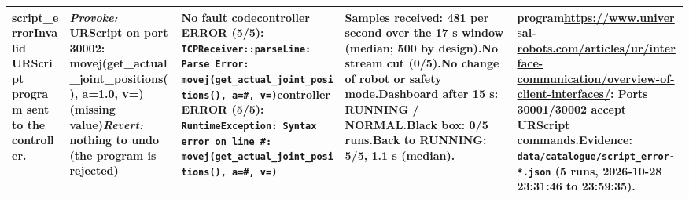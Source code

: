 \documentclass[10pt]{article}
\begin{document}
\begin{longtable}{@{}>{\raggedright\arraybackslash}p{2.7cm}>{\raggedright\arraybackslash}p{4.0cm}>{\raggedright\arraybackslash}p{7.6cm}>{\raggedright\arraybackslash}p{5.2cm}>{\raggedright\arraybackslash}p{6.0cm}@{}}
\textbf{script\_\allowbreak{}error}\newline Invalid URScript program sent to the controller. & \textit{Provoke:} URScript on port 30002: movej(get\_\allowbreak{}actual\_\allowbreak{}joint\_\allowbreak{}positions(),\allowbreak{} a=1.0,\allowbreak{} v=)  (missing value)\newline\textit{Revert:} nothing to undo (the program is rejected) & \textbf{No fault code}\newline \textsf{controller} ERROR (5/5): \texttt{TCPReceiver::parseLine: Parse Error: movej(get\_\allowbreak{}actual\_\allowbreak{}joint\_\allowbreak{}positions(),\allowbreak{} a=\#,\allowbreak{} v=)}\newline \textsf{controller} ERROR (5/5): \texttt{RuntimeException: Syntax error on line \#: movej(get\_\allowbreak{}actual\_\allowbreak{}joint\_\allowbreak{}positions(),\allowbreak{} a=\#,\allowbreak{} v=)} & Samples received: 481 per second over the 17 s window (median; 500 by design).\newline No stream cut (0/5).\newline No change of robot or safety mode.\newline Dashboard after 15 s: RUNNING / NORMAL.\newline Black box: 0/5 runs.\newline Back to RUNNING: 5/5, 1.1 s (median). & \textbf{program}\newline \url{https://www.universal-robots.com/articles/ur/interface-communication/overview-of-client-interfaces/}: Ports 30001/30002 accept URScript commands.\newline Evidence: \texttt{data/catalogue/script\_\allowbreak{}error-*.json} (5 runs, 2026-10-28 23:31:46 to 23:59:35). \\ \midrule

\end{longtable}
\end{document}
